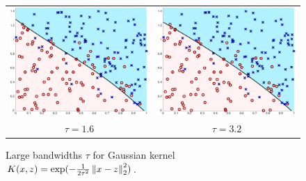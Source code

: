 \documentclass{article}
\begin{document}
\begin{figure}[ht]
  \begin{center}
    \begin{tabular}{cc}
      \hspace{-2cm}
      \includegraphics[width=.6\columnwidth,clip]{kernel_train_1.600.eps} &
      \hspace{-.5cm}
      \includegraphics[width=.6\columnwidth,clip]{kernel_train_3.200.eps} \\
      \hspace{-2cm} $\tau = 1.6$ & \hspace{-.5cm} $\tau = 3.2$
    \end{tabular}
    \caption{\label{fig:kernel-bandwidths-large}
      Large bandwidths $\tau$ for Gaussian kernel
      $K(x, z) = \exp(-\frac{1}{2 \tau^2} \left\|{x - z}\right\|_2^2)$.}
  \end{center}
\end{figure}
\end{document}
